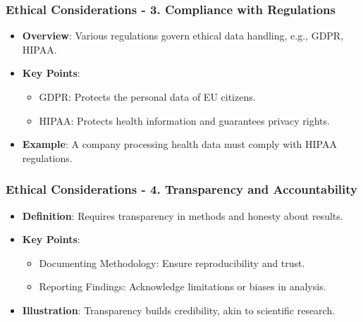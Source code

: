 \documentclass{beamer}
\begin{document}
\begin{frame}[fragile]
    \frametitle{Ethical Considerations - 3. Compliance with Regulations}
    \begin{itemize}
        \item \textbf{Overview}: Various regulations govern ethical data handling, e.g., GDPR, HIPAA.
        \item \textbf{Key Points}:
        \begin{itemize}
            \item GDPR: Protects the personal data of EU citizens.
            \item HIPAA: Protects health information and guarantees privacy rights.
        \end{itemize}
        \item \textbf{Example}: A company processing health data must comply with HIPAA regulations.
    \end{itemize}
\end{frame}

\begin{frame}[fragile]
    \frametitle{Ethical Considerations - 4. Transparency and Accountability}
    \begin{itemize}
        \item \textbf{Definition}: Requires transparency in methods and honesty about results.
        \item \textbf{Key Points}:
        \begin{itemize}
            \item Documenting Methodology: Ensure reproducibility and trust.
            \item Reporting Findings: Acknowledge limitations or biases in analysis.
        \end{itemize}
        \item \textbf{Illustration}: Transparency builds credibility, akin to scientific research.
    \end{itemize}
\end{frame}
\end{document}
